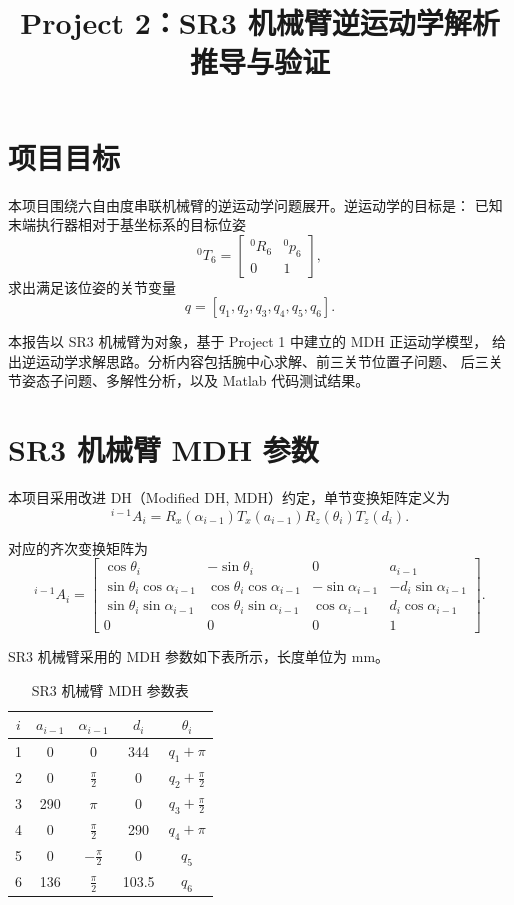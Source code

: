 \documentclass[UTF8,a4paper,12pt]{ctexart}
\title{Project 2：SR3 机械臂逆运动学解析推导与验证}
\author{}
\date{}
\begin{document}
\maketitle

\section{项目目标}

本项目围绕六自由度串联机械臂的逆运动学问题展开。逆运动学的目标是：
已知末端执行器相对于基坐标系的目标位姿
\[
{}^{0}T_{6}=
\begin{bmatrix}
{}^{0}R_{6} & {}^{0}p_{6}\\
0&1
\end{bmatrix},
\]
求出满足该位姿的关节变量
\[
q=[q_1,q_2,q_3,q_4,q_5,q_6].
\]

本报告以 SR3 机械臂为对象，基于 Project 1 中建立的 MDH 正运动学模型，
给出逆运动学求解思路。分析内容包括腕中心求解、前三关节位置子问题、
后三关节姿态子问题、多解性分析，以及 Matlab 代码测试结果。

\section{SR3 机械臂 MDH 参数}

本项目采用改进 DH（Modified DH, MDH）约定，单节变换矩阵定义为
\[
{}^{i-1}A_i
=R_x(\alpha_{i-1})T_x(a_{i-1})R_z(\theta_i)T_z(d_i).
\]

对应的齐次变换矩阵为
\[
{}^{i-1}A_i=
\begin{bmatrix}
\cos\theta_i & -\sin\theta_i & 0 & a_{i-1}\\
\sin\theta_i\cos\alpha_{i-1} &
\cos\theta_i\cos\alpha_{i-1} &
-\sin\alpha_{i-1} &
-d_i\sin\alpha_{i-1}\\
\sin\theta_i\sin\alpha_{i-1} &
\cos\theta_i\sin\alpha_{i-1} &
\cos\alpha_{i-1} &
d_i\cos\alpha_{i-1}\\
0&0&0&1
\end{bmatrix}.
\]

SR3 机械臂采用的 MDH 参数如下表所示，长度单位为 mm。

\begin{table}[h]
\centering
\begin{tabular}{ccccc}
\toprule
$i$ & $a_{i-1}$ & $\alpha_{i-1}$ & $d_i$ & $\theta_i$\\
\midrule
1 & 0   & $0$           & 344   & $q_1+\pi$\\
2 & 0   & $\frac{\pi}{2}$ & 0     & $q_2+\frac{\pi}{2}$\\
3 & 290 & $\pi$         & 0     & $q_3+\frac{\pi}{2}$\\
4 & 0   & $\frac{\pi}{2}$ & 290   & $q_4+\pi$\\
5 & 0   & $-\frac{\pi}{2}$& 0     & $q_5$\\
6 & 136 & $\frac{\pi}{2}$ & 103.5 & $q_6$\\
\bottomrule
\end{tabular}
\caption{SR3 机械臂 MDH 参数表}
\end{table}
\end{document}
